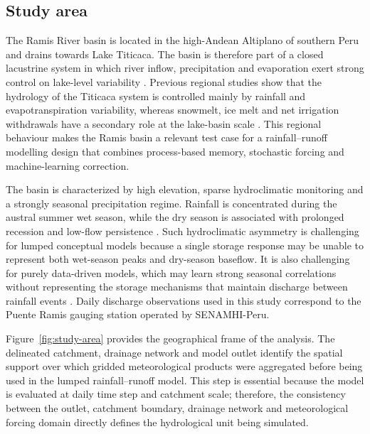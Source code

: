 \subsection{Study area}\label{subsec:study-area}

The Ramis River basin is located in the high-Andean Altiplano of
southern Peru and drains towards Lake Titicaca. The basin is therefore
part of a closed lacustrine system in which river inflow, precipitation
and evaporation exert strong control on lake-level variability
\citep{cross2001late,condom2004transient,lima2025modeling}. Previous
regional studies show that the hydrology of the Titicaca system is
controlled mainly by rainfall and evapotranspiration variability,
whereas snowmelt, ice melt and net irrigation withdrawals have a
secondary role at the lake-basin scale \citep{lima2025modeling}. This
regional behaviour makes the Ramis basin a relevant test case for a
rainfall--runoff modelling design that combines process-based memory,
stochastic forcing and machine-learning correction.

The basin is characterized by high elevation, sparse hydroclimatic
monitoring and a strongly seasonal precipitation regime. Rainfall is
concentrated during the austral summer wet season, while the dry season
is associated with prolonged recession and low-flow persistence
\citep{condom2004transient,nauditt2017conceptual,lima2025modeling}.
Such hydroclimatic asymmetry is challenging for lumped conceptual
models because a single storage response may be unable to represent both
wet-season peaks and dry-season baseflow. It is also challenging for
purely data-driven models, which may learn strong seasonal correlations
without representing the storage mechanisms that maintain discharge
between rainfall events \citep{van2013influence,lees2021benchmarking}.
Daily discharge observations used in this study correspond to the
Puente Ramis gauging station operated by SENAMHI-Peru.

Figure~\ref{fig:study-area} provides the geographical frame of the
analysis. The delineated catchment, drainage network and model outlet
identify the spatial support over which gridded meteorological products
were aggregated before being used in the lumped rainfall--runoff model.
This step is essential because the model is evaluated at daily time step
and catchment scale; therefore, the consistency between the outlet,
catchment boundary, drainage network and meteorological forcing domain
directly defines the hydrological unit being simulated.

